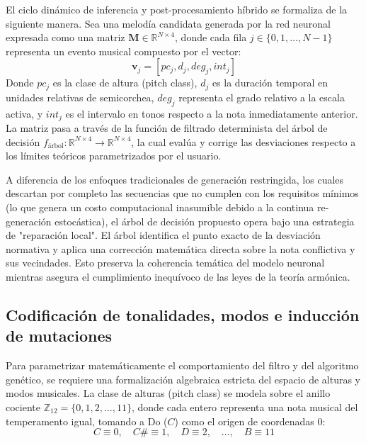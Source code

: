 El ciclo dinámico de inferencia y post-procesamiento híbrido se formaliza de la siguiente manera. Sea una melodía candidata generada por la red neuronal expresada como una matriz $\mathbf{M} \in \mathbb{R}^{N \times 4}$, donde cada fila $j \in \{0, 1, \dots, N-1\}$ representa un evento musical compuesto por el vector:
\begin{equation}
    \mathbf{v}_j = [pc_j, d_j, deg_j, int_j]
\end{equation}
Donde $pc_j$ es la clase de altura (pitch class), $d_j$ es la duración temporal en unidades relativas de semicorchea, $deg_j$ representa el grado relativo a la escala activa, y $int_j$ es el intervalo en tonos respecto a la nota inmediatamente anterior. La matriz pasa a través de la función de filtrado determinista del árbol de decisión $f_{\text{árbol}}: \mathbb{R}^{N \times 4} \to \mathbb{R}^{N \times 4}$, la cual evalúa y corrige las desviaciones respecto a los límites teóricos parametrizados por el usuario. 

A diferencia de los enfoques tradicionales de generación restringida, los cuales descartan por completo las secuencias que no cumplen con los requisitos mínimos (lo que genera un costo computacional inasumible debido a la continua re-generación estocástica), el árbol de decisión propuesto opera bajo una estrategia de "reparación local". El árbol identifica el punto exacto de la desviación normativa y aplica una corrección matemática directa sobre la nota conflictiva y sus vecindades. Esto preserva la coherencia temática del modelo neuronal mientras asegura el cumplimiento inequívoco de las leyes de la teoría armónica.

\subsection{Codificación de tonalidades, modos e inducción de mutaciones}

Para parametrizar matemáticamente el comportamiento del filtro y del algoritmo genético, se requiere una formalización algebraica estricta del espacio de alturas y modos musicales. La clase de alturas (pitch class) se modela sobre el anillo cociente $\mathbb{Z}_{12} = \{0, 1, 2, \dots, 11\}$, donde cada entero representa una nota musical del temperamento igual, tomando a Do ($C$) como el origen de coordenadas $0$:
\begin{equation}
    C \equiv 0, \quad C\# \equiv 1, \quad D \equiv 2, \quad \dots, \quad B \equiv 11
\end{equation}

